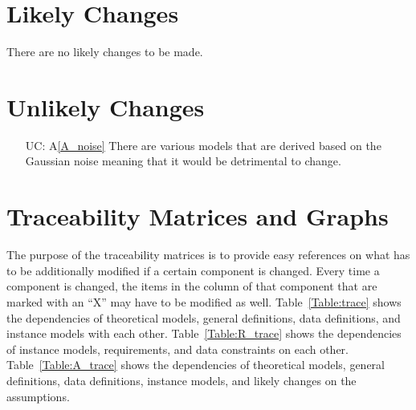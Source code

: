 \documentclass[12pt]{article}
\newcommand{\aref}[1]{A\ref{#1}}
\newcounter{lcnum} %
\newcounter{ucnum} %
\begin{document}
\section{Likely Changes}    

There are no likely changes to be made.




\section{Unlikely Changes}    

\noindent \begin{itemize}

\item[UC\refstepcounter{ucnum}\theucnum\label{UC_noise}:] \aref{A_noise} There are various models that are derived based on the Gaussian noise meaning that it would be detrimental to change.

\end{itemize}

\section{Traceability Matrices and Graphs}

The purpose of the traceability matrices is to provide easy references on what
has to be additionally modified if a certain component is changed.  Every time a
component is changed, the items in the column of that component that are marked
with an ``X'' may have to be modified as well.  Table~\ref{Table:trace} shows the
dependencies of theoretical models, general definitions, data definitions, and
instance models with each other. Table~\ref{Table:R_trace} shows the
dependencies of instance models, requirements, and data constraints on each
other. Table~\ref{Table:A_trace} shows the dependencies of theoretical models,
general definitions, data definitions, instance models, and likely changes on
the assumptions.


\end{document}
